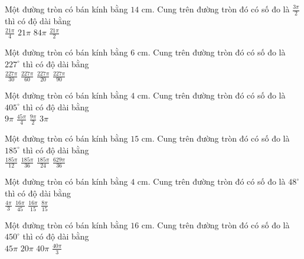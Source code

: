 \documentclass[12pt,a4paper]{article}
\begin{document}
\begin{ex}
 Một đường tròn có bán kính bằng ${14}$ cm. Cung trên đường tròn đó có số đo là ${\frac{3 \pi}{2}}$ thì có độ dài bằng\\ 
\choice
{ $\frac{21 \pi}{4}$ }
   { \True $21 \pi$ }
     { $84 \pi$ }
    { $\frac{21 \pi}{2}$ }
\end{ex}

\begin{ex}
 Một đường tròn có bán kính bằng ${6}$ cm. Cung trên đường tròn đó có số đo là ${227}^\circ$ thì có độ dài bằng\\ 
\choice
{ \True $\frac{227 \pi}{30}$ }
   { $\frac{227 \pi}{60}$ }
     { $\frac{227 \pi}{20}$ }
    { $\frac{227 \pi}{90}$ }
\end{ex}

\begin{ex}
 Một đường tròn có bán kính bằng ${4}$ cm. Cung trên đường tròn đó có số đo là ${405}^\circ$ thì có độ dài bằng\\ 
\choice
{ \True $9 \pi$ }
   { $\frac{45 \pi}{4}$ }
     { $\frac{9 \pi}{2}$ }
    { $3 \pi$ }
\end{ex}

\begin{ex}
 Một đường tròn có bán kính bằng ${15}$ cm. Cung trên đường tròn đó có số đo là ${185}^\circ$ thì có độ dài bằng\\ 
\choice
{ \True $\frac{185 \pi}{12}$ }
   { $\frac{185 \pi}{36}$ }
     { $\frac{185 \pi}{24}$ }
    { $\frac{629 \pi}{36}$ }
\end{ex}

\begin{ex}
 Một đường tròn có bán kính bằng ${4}$ cm. Cung trên đường tròn đó có số đo là ${48}^\circ$ thì có độ dài bằng\\ 
\choice
{ $\frac{4 \pi}{3}$ }
   { $\frac{16 \pi}{45}$ }
     { \True $\frac{16 \pi}{15}$ }
    { $\frac{8 \pi}{15}$ }
\end{ex}

\begin{ex}
 Một đường tròn có bán kính bằng ${16}$ cm. Cung trên đường tròn đó có số đo là ${450}^\circ$ thì có độ dài bằng\\ 
\choice
{ $45 \pi$ }
   { $20 \pi$ }
     { \True $40 \pi$ }
    { $\frac{40 \pi}{3}$ }
\end{ex}
\end{document}
